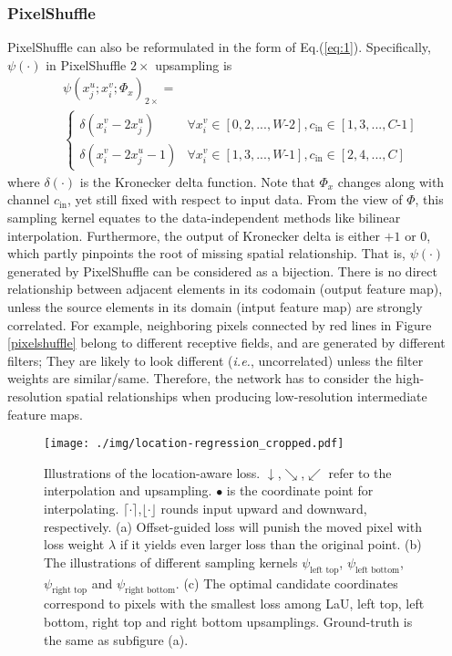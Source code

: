\documentclass[10pt,twocolumn,letterpaper]{article}
\begin{document}
\subsubsection{PixelShuffle}
PixelShuffle can also be reformulated in the form of Eq.(\ref{eq:1}). Specifically, $\psi(\cdot)$ in PixelShuffle $2\times$ upsampling is
\begin{equation*}
\begin{aligned}
&\psi(x_j^u;x_i^v;\Phi_x)_{2\times}=\\
&\begin{cases}
\delta(x_i^v-2x_j^u) & \forall x_i^v\in[0,2,...,W\text{-2}], c_{\text{in}}\in[1,3,...,C\text{-1}] \\
\delta(x_i^v-2x_j^u-1) & \forall x_i^v\in[1,3,...,W\text{-1}], c_{\text{in}}\in[2,4,...,C]
\end{cases}
\end{aligned}
\end{equation*}
where $\delta(\cdot)$ is the Kronecker delta function. Note that $\Phi_x$ changes along with channel $c_{\text{in}}$, yet still fixed with respect to input data. From the view of $\Phi$, this sampling kernel equates to the data-independent methods like bilinear interpolation. Furthermore, the output of Kronecker delta is either $+1$ or $0$, which partly pinpoints the root of missing spatial relationship. That is, $\psi(\cdot)$ generated by PixelShuffle can be considered as a bijection. There is no direct relationship between adjacent elements in its codomain (output feature map), unless the source elements in its domain (intput feature map) are strongly correlated. For example, neighboring pixels connected by red lines in Figure \ref{pixelshuffle} belong to different receptive fields, and are generated by different filters; They are likely to look different (\textit{i.e.}, uncorrelated) unless the filter weights are similar/same. Therefore, the network has to consider the high-resolution spatial relationships when producing low-resolution intermediate feature maps.

\begin{figure*}
  \centering
  \texttt{[image: ./img/location-regression\_cropped.pdf]} 
  \caption{Illustrations of the location-aware loss. $\downarrow$,$\searrow$,$\swarrow$ refer to the interpolation and upsampling. $\bullet$ is the coordinate point for interpolating. $\lceil\cdot\rceil$,$\lfloor\cdot\rfloor$ rounds input upward and downward, respectively. (a) Offset-guided loss will punish the moved pixel with loss weight $\lambda$ if it yields even larger loss than the original point. (b) The illustrations of different sampling kernels $\psi_{\text{left top}}$, $\psi_{\text{left bottom}}$, $\psi_{\text{right top}}$ and $\psi_{\text{right bottom}}$. (c) The optimal candidate coordinates correspond to pixels with the smallest loss among LaU, left top, left bottom, right top and right bottom upsamplings. Ground-truth is the same as subfigure (a).}
\label{loss}
\end{figure*}
\end{document}
